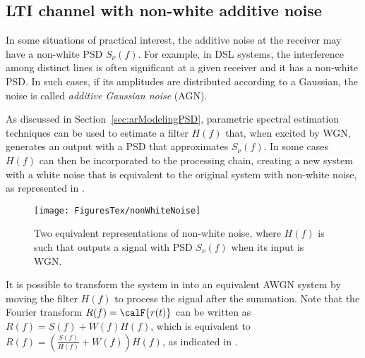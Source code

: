 

\subsection{LTI channel with non-white additive noise}

In some situations of practical interest, the additive noise at the receiver may have a
non-white PSD $S_{\nu}(f)$. For example, in DSL systems, the interference among distinct
lines is often significant at a given receiver and it has a non-white PSD. 
In such cases, if its amplitudes are distributed according to a Gaussian,
the noise is called \emph{additive Gaussian noise} (AGN).

As discussed in Section~\ref{sec:arModelingPSD}, parametric spectral estimation techniques
can be used to estimate a filter $H(f)$ that, when excited by WGN, generates an output with a PSD 
that approximates $S_{\nu}(f)$. In some cases $H(f)$ can then be incorporated to the processing
chain, creating a new system with a white noise that is equivalent to the original 
system with non-white noise, as represented in .

\begin{figure}[htbp]
\centering
\texttt{[image: FiguresTex/nonWhiteNoise]}
\caption{Two equivalent representations of non-white noise, where $H(f)$ is such that
outputs a signal with PSD $S_{\nu}(f)$ when its input is WGN.\label{fig:nonWhiteNoise}}
\end{figure}

It is possible to transform the system in  into an equivalent AWGN system
by moving the filter $H(f)$ to process the signal after the summation. Note that the Fourier
transform $R(f) = \calF \{ r(t) \}$ can be written as $R(f)=S(f) + W(f)H(f)$, which is 
equivalent to $R(f)=\left(\frac{S(f)}{H(f)} + W(f)\right)H(f)$, as indicated in .

